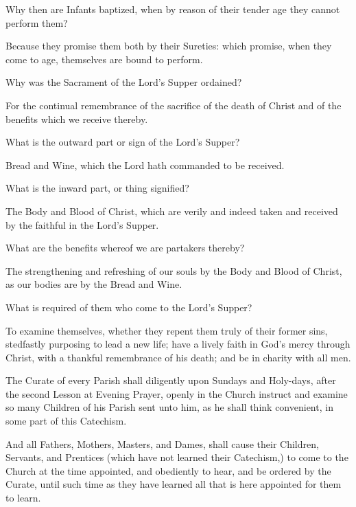  Why then are Infants baptized, when by reason of their tender age they cannot perform them?

   Because they promise them both by their Sureties: which promise, when they come to age, themselves are bound to perform.

 Why was the Sacrament of the Lord's Supper ordained?

   For the continual remembrance of the sacrifice of the death of Christ and of the benefits which we receive thereby.

 What is the outward part or sign of the Lord's Supper?

   Bread and Wine, which the Lord hath commanded to be received.

 What is the inward part, or thing signified?

   The Body and Blood of Christ, which are verily and indeed taken and received by the faithful in the Lord's Supper.

 What are the benefits whereof we are partakers thereby?

   The strengthening and refreshing of our souls by the Body and Blood of Christ, as our bodies are by the Bread and Wine.

 What is required of them who come to the Lord's Supper?

   To examine themselves, whether they repent them truly of their former sins, stedfastly purposing to lead a new life; have a lively faith in God's mercy through Christ, with a thankful remembrance of his death; and be in charity with all men.

\begin{rubric}
The Curate of every Parish shall diligently upon Sundays and Holy-days, after the second Lesson at Evening Prayer, openly in the Church instruct and examine so many Children of his Parish sent unto him, as he shall think convenient, in some part of this Catechism.
\end{rubric}

\begin{rubric}
And all Fathers, Mothers, Masters, and Dames, shall cause their Children, Servants, and Prentices (which have not learned their Catechism,) to come to the Church at the time appointed, and obediently to hear, and be ordered by the Curate, until such time as they have learned all that is here appointed for them to learn.
\end{rubric}

